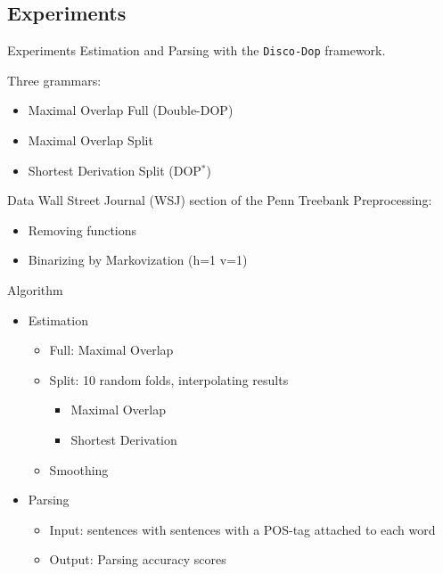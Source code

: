 \documentclass{beamer}
\newcommand{\dops}[0]{DOP$ ^*$}
\newcommand{\ddop}[0]{Double-DOP}
\begin{document}
\subsection{Experiments}

\begin{frame}{Experiments}
Estimation and Parsing with the {\tt Disco-Dop} framework.

Three grammars:
\begin{itemize}
\item Maximal Overlap Full (\ddop{})
\item Maximal Overlap Split
\item Shortest Derivation Split (\dops{})
\end{itemize}
\end{frame}
\begin{frame}{Data}
Wall Street Journal (WSJ) section of the Penn Treebank
Preprocessing:\begin{itemize}
\item Removing functions
\item Binarizing by Markovization (h=1 v=1)

\end{itemize}
\end{frame}

\begin{frame}{Algorithm}
\begin{itemize}
	\item Estimation
		\begin{itemize}
			\item Full: Maximal Overlap
			\item Split: 10 random folds, interpolating results
				\begin{itemize} 
					\item Maximal Overlap 
					\item Shortest Derivation
				\end{itemize}
			\item Smoothing
		\end{itemize}
	\item Parsing
		\begin{itemize}
			\item Input: sentences with  sentences with a POS-tag attached to each word
			\item Output: Parsing accuracy scores
		\end{itemize}
\end{itemize}
\end{frame}
\end{document}
